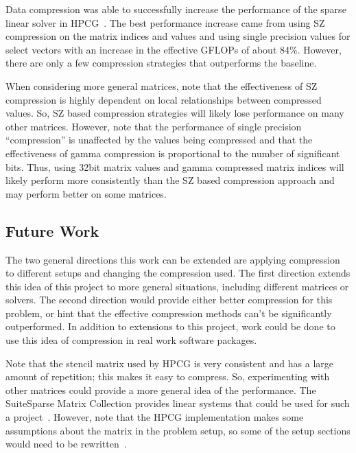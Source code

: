 
Data compression was able to successfully increase the performance of the sparse linear solver in HPCG~\cite{Dongarra:2015:HPCG}.
The best performance increase came from using SZ compression on the matrix indices and values and using single precision values for select vectors with an increase in the effective GFLOPs of about 84\%.
However, there are only a few compression strategies that outperforms the baseline.

When considering more general matrices, note that the effectiveness of SZ compression is highly dependent on local relationships between compressed values.
So, SZ based compression strategies will likely lose performance on many other matrices.
However, note that the performance of single precision ``compression'' is unaffected by the values being compressed and that the effectiveness of gamma compression is proportional to the number of significant bits.
Thus, using 32bit matrix values and gamma compressed matrix indices will likely perform more consistently than the SZ based compression approach and may perform better on some matrices.

\subsection{Future Work}
The two general directions this work can be extended are applying compression to different setups and changing the compression used.
The first direction extends this idea of this project to more general situations, including different matrices or solvers.
The second direction would provide either better compression for this problem, or hint that the effective compression methods can't be significantly outperformed.
In addition to extensions to this project, work could be done to use this idea of compression in real work software packages.

Note that the stencil matrix used by HPCG is very consistent and has a large amount of repetition; this makes it easy to compress.
So, experimenting with other matrices could provide a more general idea of the performance.
The SuiteSparse Matrix Collection provides linear systems that could be used for such a project~\cite{Davis:2011:FloridaMatrixCollection}.
However, note that the HPCG implementation makes some assumptions about the matrix in the problem setup, so some of the setup sections would need to be rewritten~\cite{Dongarra:2015:HPCG}.

